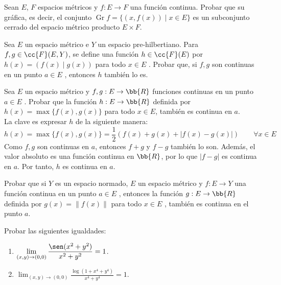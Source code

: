 \begin{ejercicio}
    Sean $E$, $F$ espacios métricos y $f:E\to F$ una función continua. Probar que su gráfica, es decir, el conjunto $\operatorname{Gr} f = \{(x,f(x))\mid x\in E\}$ es un subconjunto cerrado del espacio métrico producto $E \times F$.
\end{ejercicio}


\begin{ejercicio}
    Sea $E$ un espacio métrico e $Y$ un espacio pre-hilbertiano. Para $f,g \in \cc{F}(E,Y)$, se define una función $h \in \cc{F}(E)$ por $h(x)=\left(f(x)\mid g(x)\right)$ para todo $x\in E$ . Probar que, si $f,g$ son continuas en un punto $a \in E$ , entonces $h$ también lo es.
\end{ejercicio}


\begin{ejercicio}
    Sea $E$ un espacio métrico y $f,g : E \to \bb{R}$ funciones continuas en un punto $a\in E$ . Probar que la función $h : E \to \bb{R}$ definida por $h(x) = \max \{f(x), g(x)\}$ para todo $x\in E$, también es continua en $a$.\\

    La clave es expresar $h$ de la siguiente manera:
    $$h(x)=\max\{f(x),g(x)\}=\frac{1}{2}\left(f(x)+g(x)+|f(x)-g(x)|\right) \qquad \forall x\in E$$
    Como $f,g$ son continuas en $a$, entonces $f+g$ y $f-g$ también lo son. Además, el valor absoluto es una función continua en $\bb{R}$,
    por lo que $|f-g|$ es continua en $a$. Por tanto, $h$ es continua en $a$.
\end{ejercicio}


\begin{ejercicio}
    Probar que si $Y$ es un espacio normado, $E$ un espacio métrico y $f:E \to Y$ una función continua en un punto $a \in E$ , entonces la función $g: E \to \bb{R}$ definida por $g(x)=\|f(x)\|$ para todo $x\in E$ , también es continua en el punto $a$.
\end{ejercicio}

\begin{ejercicio}
    Probar las siguientes igualdades:
    \begin{enumerate}
        \item $\displaystyle \lim_{(x,y)\to (0,0)} \frac{\sen(x^2 + y^2)}{x^2+y^2} = 1$.
        \item $\displaystyle \lim_{(x,y)\to (0,0)} \frac{\log(1+x^4 + y^4)}{x^4+y^4} = 1$.
    \end{enumerate}
\end{ejercicio}